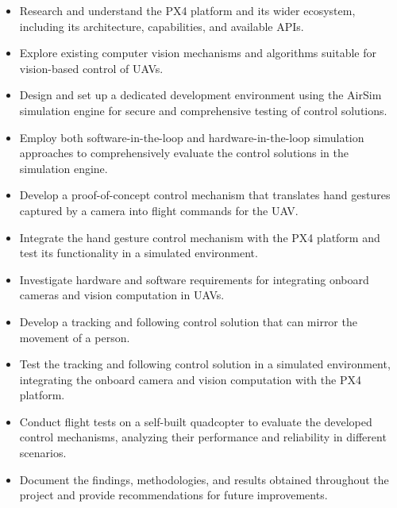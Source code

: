 \begin{itemize}
    \item Research and understand the PX4 platform and its wider ecosystem, including its architecture, capabilities, and available APIs.
    \item Explore existing computer vision mechanisms and algorithms suitable for vision-based control of UAVs.
    \item Design and set up a dedicated development environment using the AirSim simulation engine for secure and comprehensive testing of control solutions.
    \item Employ both software-in-the-loop and hardware-in-the-loop simulation approaches to comprehensively evaluate the control solutions in the simulation engine.
    \item Develop a proof-of-concept control mechanism that translates hand gestures captured by a camera into flight commands for the UAV.
    \item Integrate the hand gesture control mechanism with the PX4 platform and test its functionality in a simulated environment.
    \item Investigate hardware and software requirements for integrating onboard cameras and vision computation in UAVs.
    \item Develop a tracking and following control solution that can mirror the movement of a person.
    \item Test the tracking and following control solution in a simulated environment, integrating the onboard camera and vision computation with the PX4 platform.
    \item Conduct flight tests on a self-built quadcopter to evaluate the developed control mechanisms, analyzing their performance and reliability in different scenarios.
    \item Document the findings, methodologies, and results obtained throughout the project and provide recommendations for future improvements.
\end{itemize}



